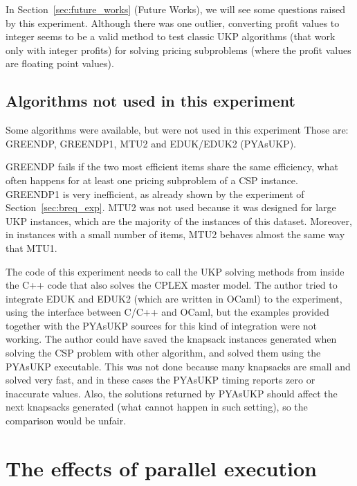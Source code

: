 In Section~\ref{sec:future_works} (Future Works), we will see some questions raised by this experiment.
Although there was one outlier, converting profit values to integer seems to be a valid method to test classic UKP algorithms (that work only with integer profits) for solving pricing subproblems (where the profit values are floating point values). 

\subsection{Algorithms not used in this experiment}
\label{sec:csp_alg_not_used}

Some algorithms were available, but were not used in this experiment
Those are: GREENDP, GREENDP1, MTU2 and EDUK/EDUK2 (PYAsUKP).

GREENDP fails if the two most efficient items share the same efficiency, what often happens for at least one pricing subproblem of a CSP instance.
GREENDP1 is very inefficient, as already shown by the experiment of Section~\ref{sec:breq_exp}.
MTU2 was not used because it was designed for large UKP instances, which are the majority of the instances of this dataset.
Moreover, in instances with a small number of items, MTU2 behaves almost the same way that MTU1.

The code of this experiment needs to call the UKP solving methods from inside the C++ code that also solves the CPLEX master model.
The author tried to integrate EDUK and EDUK2 (which are written in OCaml) to the experiment, using the interface between C/C++ and OCaml, but the examples provided together with the PYAsUKP sources for this kind of integration were not working.
The author could have saved the knapsack instances generated when solving the CSP problem with other algorithm, and solved them using the PYAsUKP executable.
This was not done because many knapsacks are small and solved very fast, and in these cases the PYAsUKP timing reports zero or inaccurate values.
Also, the solutions returned by PYAsUKP should affect the next knapsacks generated (what cannot happen in such setting), so the comparison would be unfair.

\section{The effects of parallel execution}
\label{sec:serial_parallel_exp}

